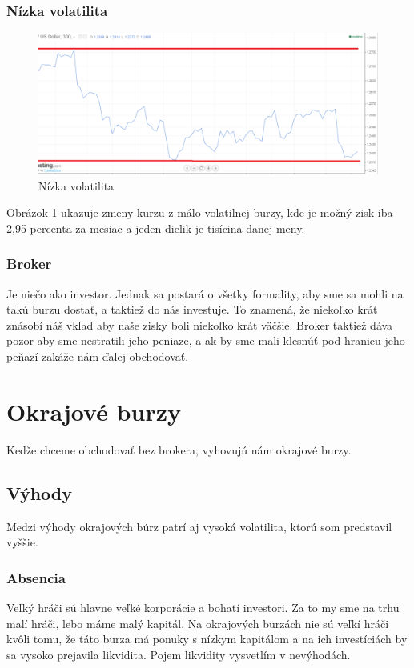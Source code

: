 \subsubsection{Nízka volatilita}  
\begin{figure}[!hbt] 
\begin{center} 
\includegraphics[width=1\textwidth]{obr2} 
\caption{Nízka volatilita} 
\label{img:nvolat} 
\end{center} 
\end{figure} 

\begin{myex}
Obrázok \ref{img:nvolat} ukazuje zmeny kurzu z málo volatilnej burzy, kde je  možný zisk iba 2,95 percenta za mesiac a jeden dielik je tisícina danej meny.   
\end{myex}


\subsubsection{Broker} 
Je niečo ako investor. Jednak sa postará o všetky formality, aby sme sa mohli na takú burzu dostať, a taktiež do nás investuje. To znamená, že niekoľko krát znásobí náš vklad aby naše zisky boli niekoľko krát väčšie. Broker taktiež dáva pozor aby sme nestratili jeho peniaze, a ak by sme mali klesnúť pod hranicu jeho peňazí zakáže nám ďalej obchodovať. \cite{ZAC}  
\section{Okrajové burzy} 
Keďže chceme obchodovať bez brokera, vyhovujú nám okrajové burzy. 
\subsection{Výhody} 
Medzi výhody okrajových búrz patrí aj vysoká volatilita, ktorú som predstavil vyššie. 
\subsubsection{Absencia } 
Veľký hráči\cite{ZAC} sú hlavne veľké korporácie a bohatí investori. Za to my sme na trhu malí hráči, lebo máme malý kapitál. Na okrajových burzách nie sú veľkí hráči kvôli tomu, že táto burza má ponuky s nízkym kapitálom a na ich investíciách by sa vysoko prejavila likvidita. Pojem likvidity vysvetlím v nevýhodách. 
